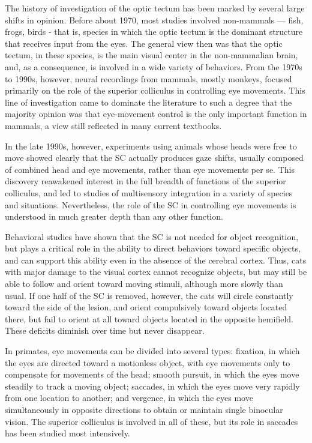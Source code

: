 The history of investigation of the optic tectum has been marked by several large shifts in opinion. Before about 1970, most studies involved non-mammals --- fish, frogs, birds - that is, species in which the optic tectum is the dominant structure that receives input from the eyes. The general view then was that the optic tectum, in these species, is the main visual center in the non-mammalian brain, and, as a consequence, is involved in a wide variety of behaviors. From the 1970s to 1990s, however, neural recordings from mammals, mostly monkeys, focused primarily on the role of the superior colliculus in controlling eye movements. This line of investigation came to dominate the literature to such a degree that the majority opinion was that eye-movement control is the only important function in mammals, a view still reflected in many current textbooks.

In the late 1990s, however, experiments using animals whose heads were free to move showed clearly that the SC actually produces gaze shifts, usually composed of combined head and eye movements, rather than eye movements per se. This discovery reawakened interest in the full breadth of functions of the superior colliculus, and led to studies of multisensory integration in a variety of species and situations. Nevertheless, the role of the SC in controlling eye movements is understood in much greater depth than any other function.

Behavioral studies have shown that the SC is not needed for object recognition, but plays a critical role in the ability to direct behaviors toward specific objects, and can support this ability even in the absence of the cerebral cortex. Thus, cats with major damage to the visual cortex cannot recognize objects, but may still be able to follow and orient toward moving stimuli, although more slowly than usual. If one half of the SC is removed, however, the cats will circle constantly toward the side of the lesion, and orient compulsively toward objects located there, but fail to orient at all toward objects located in the opposite hemifield. These deficits diminish over time but never disappear.

In primates, eye movements can be divided into several types: fixation, in which the eyes are directed toward a motionless object, with eye movements only to compensate for movements of the head; smooth pursuit, in which the eyes move steadily to track a moving object; saccades, in which the eyes move very rapidly from one location to another; and vergence, in which the eyes move simultaneously in opposite directions to obtain or maintain single binocular vision. The superior colliculus is involved in all of these, but its role in saccades has been studied most intensively.


